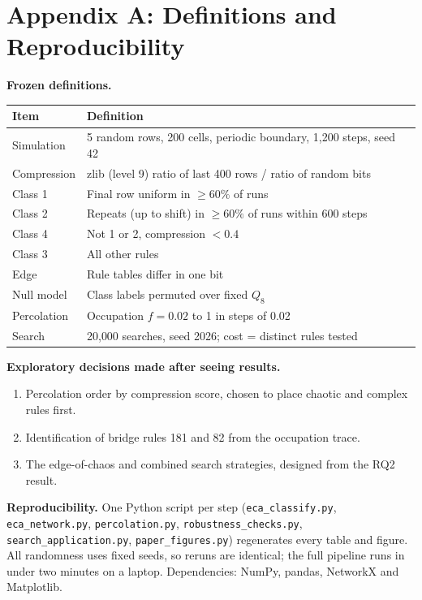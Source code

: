 \documentclass[10pt,letterpaper,twocolumn]{article}
\newcommand{\para}[1]{\textbf{#1}\hspace{0.4em}}
\begin{document}
\normalsize
\section*{Appendix A: Definitions and Reproducibility}

\para{Frozen definitions.}

\begin{center}\small
\begin{tabular}{@{}p{}p{}@{}}
\toprule
Item & Definition \\
\midrule
Simulation & 5 random rows, 200 cells, periodic boundary, 1{,}200 steps, seed 42 \\
Compression & zlib (level 9) ratio of last 400 rows / ratio of random bits \\
Class 1 & Final row uniform in $\ge 60\%$ of runs \\
Class 2 & Repeats (up to shift) in $\ge 60\%$ of runs within 600 steps \\
Class 4 & Not 1 or 2, compression $< 0.4$ \\
Class 3 & All other rules \\
Edge & Rule tables differ in one bit \\
Null model & Class labels permuted over fixed $Q_8$ \\
Percolation & Occupation $f = 0.02$ to 1 in steps of 0.02 \\
Search & 20{,}000 searches, seed 2026; cost = distinct rules tested \\
\bottomrule
\end{tabular}
\end{center}

\para{Exploratory decisions made after seeing results.}
\begin{enumerate}
\item Percolation order by compression score, chosen to place chaotic and complex rules first.
\item Identification of bridge rules 181 and 82 from the occupation trace.
\item The edge-of-chaos and combined search strategies, designed from the RQ2 result.
\end{enumerate}

\para{Reproducibility.} One Python script per step (\texttt{eca\_classify.py}, \texttt{eca\_network.py}, \texttt{percolation.py}, \texttt{robustness\_checks.py}, \texttt{search\_application.py}, \texttt{paper\_figures.py}) regenerates every table and figure. All randomness uses fixed seeds, so reruns are identical; the full pipeline runs in under two minutes on a laptop. Dependencies: NumPy, pandas, NetworkX and Matplotlib.
\end{document}
